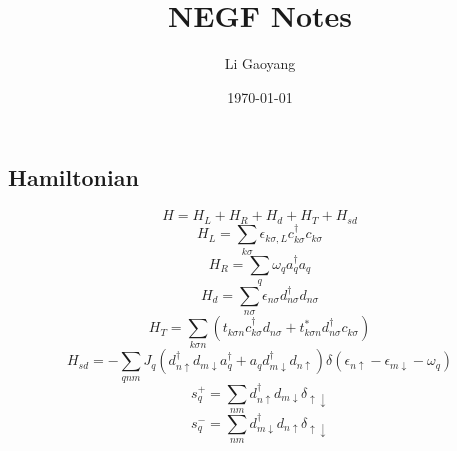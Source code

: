\documentclass[aps,prb,onecolumn,amssymb,amsmath,superscriptaddress]{revtex4-1}
\begin{document}
\title{NEGF Notes}
\author{Li Gaoyang}
\date{\today}
\maketitle


\subsection{Hamiltonian}
\begin{equation}
H=H_{L}+H_{R}+H_{d}+H_{T}+H_{s d}
\end{equation}
\begin{equation}
H_{L}=\sum_{k \sigma} \epsilon_{k \sigma, L} c_{k \sigma}^{\dagger} c_{k \sigma}
\end{equation}
\begin{equation}
H_{R}=\sum_{q} \omega_{q} a_{q}^{\dagger} a_{q}
\end{equation}
\begin{equation}
H_{d}=\sum_{n \sigma} \epsilon_{n \sigma} d_{n \sigma}^{\dagger} d_{n \sigma}
\end{equation}
\begin{equation}
H_{T}=\sum_{k \sigma n}\left(t_{k \sigma n} c_{k \sigma}^{\dagger} d_{n \sigma}+t_{k \sigma n}^{*} d_{n \sigma}^{\dagger} c_{k \sigma}\right)
\end{equation}
\begin{equation}
H_{s d}=-\sum_{q n m} J_{q}\left(d_{n \uparrow}^{\dagger} d_{m \downarrow} a_{q}^{\dagger}+a_{q} d_{m \downarrow}^{\dagger} d_{n \uparrow}\right) \delta\left(\epsilon_{n \uparrow}-\epsilon_{m \downarrow}-\omega_{q}\right)
\end{equation}
\begin{equation}
s_{q}^{+}=\sum_{n m} d_{n \uparrow}^{\dagger} d_{m \downarrow} \delta_{\uparrow \downarrow}
\end{equation}
\begin{equation}
s_{q}^{-}=\sum_{n m} d_{m \downarrow}^{\dagger} d_{n \uparrow} \delta_{\uparrow \downarrow}
\end{equation}
\end{document}
